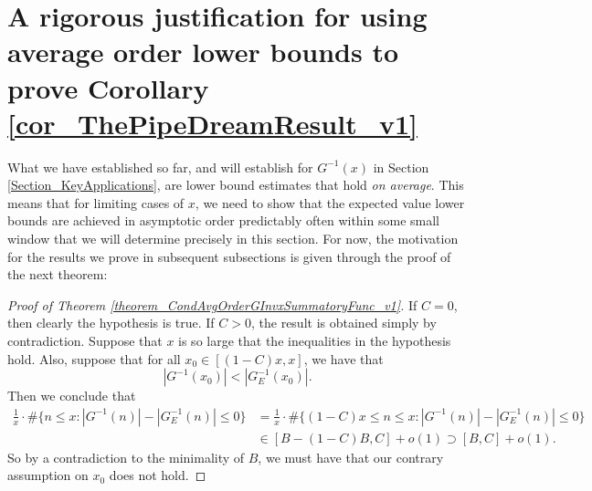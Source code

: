 \documentclass[11pt,reqno,a4letter]{article}
\numberwithin{figure}{section}
\numberwithin{table}{section}
\theoremstyle{plain}
\newtheorem{theorem}{Theorem}
\numberwithin{theorem}{section}
\theoremstyle{definition}
\begin{document}
\newpage 
\section{A rigorous justification for using average order lower bounds to prove 
         Corollary \ref{cor_ThePipeDreamResult_v1}} 
\label{Section_ProofOfValidityOfAverageOrderLowerBounds} 

What we have established so far, and will establish for $G^{-1}(x)$ in 
Section \ref{Section_KeyApplications}, are lower bound estimates that hold \emph{on average}. 
This means that for limiting cases of $x$, we need to show that the expected value lower bounds 
are achieved in asymptotic order predictably often 
within some small window that we will determine precisely in this section. 
For now, the motivation for the results we prove in subsequent subsections is given through the 
proof of the next theorem: 

\begin{proof}[Proof of Theorem \ref{theorem_CondAvgOrderGInvxSummatoryFunc_v1}] 
\label{proofOf_theorem_CondAvgOrderGInvxSummatoryFunc_v1} 
If $C = 0$, then clearly the hypothesis is true. 
If $C > 0$, the result is obtained simply by contradiction. Suppose that $x$ is so large that the inequalities in the 
hypothesis hold. Also, suppose that for all $x_0 \in [(1-C)x, x]$, we have that 
\[
|G^{-1}(x_0)| < |G_E^{-1}(x_0)|. 
\]
Then we conclude that 
\begin{align*} 
\frac{1}{x} \cdot \#\{n \leq x: |G^{-1}(n)| - |G_E^{-1}(n)| \leq 0\} & = 
     \frac{1}{x} \cdot \#\{(1-C)x \leq n \leq x: |G^{-1}(n)| - |G_E^{-1}(n)| \leq 0\} \\ 
     & \in [B-(1-C)B, C] + o(1) \supset [B, C] + o(1). 
\end{align*} 
So by a contradiction to the minimality of $B$, we must have that our contrary 
assumption on $x_0$ does not hold. 
\end{proof} 


\end{document}
